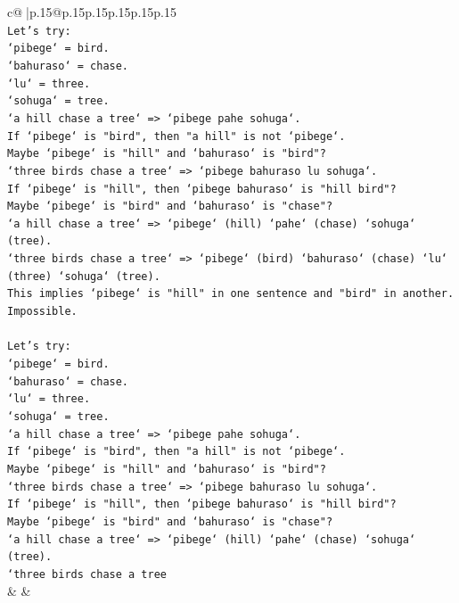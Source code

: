 \documentclass{article}
\begin{document}
{\begin{supertabular}{c@{$\;$}|p{.15\linewidth}@{}p{.15\linewidth}p{.15\linewidth}p{.15\linewidth}p{.15\linewidth}p{.15\linewidth}}
{{{\\ 
\texttt{Let's try:} \\
\texttt{`pibege` = bird.} \\
\texttt{`bahuraso` = chase.} \\
\texttt{`lu` = three.} \\
\texttt{`sohuga` = tree.} \\
\texttt{`a hill chase a tree` => `pibege pahe sohuga`.} \\
\texttt{If `pibege` is "bird", then "a hill" is not `pibege`.} \\
\texttt{Maybe `pibege` is "hill" and `bahuraso` is "bird"?} \\
\texttt{`three birds chase a tree` => `pibege bahuraso lu sohuga`.} \\
\texttt{If `pibege` is "hill", then `pibege bahuraso` is "hill bird"?} \\
\texttt{Maybe `pibege` is "bird" and `bahuraso` is "chase"?} \\
\texttt{`a hill chase a tree` => `pibege` (hill) `pahe` (chase) `sohuga` (tree).} \\
\texttt{`three birds chase a tree` => `pibege` (bird) `bahuraso` (chase) `lu` (three) `sohuga` (tree).} \\
\texttt{This implies `pibege` is "hill" in one sentence and "bird" in another. Impossible.} \\
\\ 
\texttt{Let's try:} \\
\texttt{`pibege` = bird.} \\
\texttt{`bahuraso` = chase.} \\
\texttt{`lu` = three.} \\
\texttt{`sohuga` = tree.} \\
\texttt{`a hill chase a tree` => `pibege pahe sohuga`.} \\
\texttt{If `pibege` is "bird", then "a hill" is not `pibege`.} \\
\texttt{Maybe `pibege` is "hill" and `bahuraso` is "bird"?} \\
\texttt{`three birds chase a tree` => `pibege bahuraso lu sohuga`.} \\
\texttt{If `pibege` is "hill", then `pibege bahuraso` is "hill bird"?} \\
\texttt{Maybe `pibege` is "bird" and `bahuraso` is "chase"?} \\
\texttt{`a hill chase a tree` => `pibege` (hill) `pahe` (chase) `sohuga` (tree).} \\
\texttt{`three birds chase a tree} \\
            }
        }
    }
    & & \\ \\


\end{supertabular}}
\end{document}
